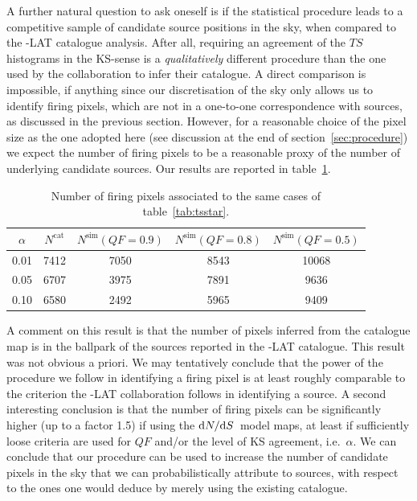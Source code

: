 A further natural question to ask oneself is if the statistical procedure leads to a competitive sample of candidate source positions in the sky, when compared to the \Fermi-LAT catalogue analysis. After all, requiring an agreement of the $TS$ histograms in the KS-sense is a \textit{qualitatively} different procedure than the one used by the collaboration to infer their catalogue. 
A direct comparison is impossible, if anything since our discretisation of the sky only allows us to identify firing pixels, which are not in a one-to-one correspondence with sources, as discussed in the previous section. However, for a reasonable choice of the pixel size as the one adopted here (see discussion at the end of section~\ref{sec:procedure}) we expect the number of  firing pixels to be a reasonable proxy of the number of underlying candidate sources. Our results are reported in table~\ref{tab:number_firing}.
\begin{table}[!h]
    \renewcommand{\arraystretch}{1.2}
    \centering
    \begin{tabular}{c|c|c|c|c}   
        $\alpha$ & $N^\textrm{cat}$ & $N^\textrm{sim}(QF=0.9)$& $N^\textrm{sim}(QF=0.8)$& $N^\textrm{sim}(QF=0.5)$\\
        \hline 
       0.01 & 7412 & 7050 & 8543  & 10068\\
        \hline 
       0.05 & 6707 & 3975 & 7891  & 9636\\
        \hline 
       0.10 & 6580 & 2492 & 5965  & 9409\\
    \end{tabular}
\caption{Number of firing pixels associated to the same cases of table~\ref{tab:tsstar}.}  
\label{tab:number_firing}
\end{table}

A comment on this result is that the number of pixels inferred from the catalogue map is in the ballpark of the sources reported in the \Fermi-LAT catalogue. This result was not obvious a priori. We may tentatively conclude that the power of the procedure we follow in identifying a firing pixel  is at least roughly comparable to the criterion the \Fermi-LAT collaboration follows in identifying a source. 
A second interesting conclusion is that the number of firing pixels can be significantly higher (up to a factor 1.5) if using the $\textrm{d}N/\textrm{d}S$~model maps, at least if sufficiently loose criteria are used for $QF$ and/or the level of KS agreement, i.e.~$\alpha$. We can conclude  that our procedure can be used to increase the number of candidate pixels in the sky that we can probabilistically attribute to sources, with respect to the ones one would deduce by merely using the existing catalogue.   

